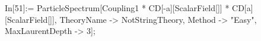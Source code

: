 In[51]:= ParticleSpectrum[Coupling1 * CD[-a][ScalarField[]] * CD[a][ScalarField[]], TheoryName -> NotStringTheory, Method -> "Easy", MaxLaurentDepth -> 3]; 